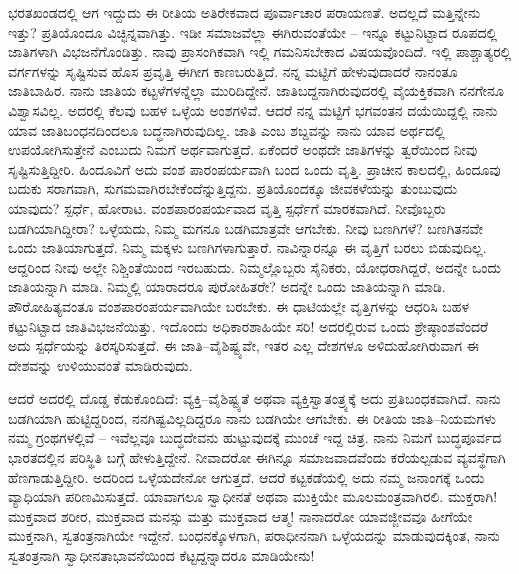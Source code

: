 ಭರತಖಂಡದಲ್ಲಿ ಆಗ ಇದ್ದುದು ಈ ರೀತಿಯ ಅತಿರೇಕವಾದ ಪೂರ್ವಾಚಾರ ಪರಾಯಣತೆ. ಅದಲ್ಲದೆ ಮತ್ತಿನ್ನೇನು ಇತ್ತು? ಪ್ರತಿಯೊಂದೂ ವಿಚ್ಛಿನ್ನವಾಗಿತ್ತು. ಇಡೀ ಸಮಾಜವೆಲ್ಲಾ ಈಗಿರುವಂತೆಯೇ – ಇನ್ನೂ ಕಟ್ಟುನಿಟ್ಟಾದ ರೂಪದಲ್ಲಿ ಜಾತಿಗಳಾಗಿ ವಿಭಜನೆಗೊಂಡಿತ್ತು. ನಾವು ಪ್ರಾಸಂಗಿಕವಾಗಿ ಇಲ್ಲಿ ಗಮನಿಸಬೇಕಾದ ವಿಷಯವೊಂದಿದೆ. ಇಲ್ಲಿ ಪಾಶ್ಚಾತ್ಯರಲ್ಲಿ ವರ್ಗಗಳನ್ನು ಸೃಷ್ಟಿಸುವ ಹೊಸ ಪ್ರವೃತ್ತಿ ಈಗೀಗ ಕಾಣಬರುತ್ತಿದೆ. ನನ್ನ ಮಟ್ಟಿಗೆ ಹೇಳುವುದಾದರೆ ನಾನಂತೂ ಜಾತಿಬಾಹಿರ. ನಾನು ಜಾತಿಯ ಕಟ್ಟಳೆಗಳನ್ನೆಲ್ಲಾ ಮುರಿದಿದ್ದೇನೆ. ಜಾತಿಬದ್ದನಾಗಿರುವುದರಲ್ಲಿ ವೈಯಕ್ತಿಕವಾಗಿ ನನಗೇನೂ ವಿಶ್ವಾಸವಿಲ್ಲ. ಅದರಲ್ಲಿ ಕೆಲವು ಬಹಳ ಒಳ್ಳೆಯ ಅಂಶಗಳಿವೆ. ಆದರೆ ನನ್ನ ಮಟ್ಟಿಗೆ ಭಗವಂತನ ದಯೆಯಿದ್ದಲ್ಲಿ ನಾನು ಯಾವ ಜಾತಿಬಂಧನದಿಂದಲೂ ಬದ್ಧನಾಗಿರುವುದಿಲ್ಲ. ಜಾತಿ ಎಂಬ ಶಬ್ದವನ್ನು ನಾನು ಯಾವ ಅರ್ಥದಲ್ಲಿ ಉಪಯೋಗಿಸುತ್ತೇನೆ ಎಂಬುದು ನಿಮಗೆ ಅರ್ಥವಾಗುತ್ತದೆ. ಏಕೆಂದರೆ ಅಂಥದೇ ಜಾತಿಗಳನ್ನು ತ್ವರೆಯಿಂದ ನೀವು ಸೃಷ್ಟಿಸುತ್ತಿದ್ದೀರಿ. ಹಿಂದೂವಿಗೆ ಅದು ವಂಶ ಪಾರಂಪರ್ಯವಾಗಿ ಬಂದ ಒಂದು ವೃತ್ತಿ. ಪ್ರಾಚೀನ ಕಾಲದಲ್ಲಿ, ಹಿಂದೂವು ಬದುಕು ಸರಾಗವಾಗಿ, ಸುಗಮವಾಗಿರಬೇಕೆಂದೆನ್ನುತ್ತಿದ್ದನು. ಪ್ರತಿಯೊಂದಕ್ಕೂ ಜೀವಕಳೆಯನ್ನು ತುಂಬುವುದು ಯಾವುದು? ಸ್ಪರ್ಧೆ, ಹೋರಾಟ. ವಂಶಪಾರಂಪರ್ಯವಾದ ವೃತ್ತಿ ಸ್ಪರ್ಧೆಗೆ ಮಾರಕವಾಗಿದೆ. ನೀವೊಬ್ಬರು ಬಡಗಿಯಾಗಿದ್ದೀರಾ? ಒಳ್ಳೆಯದು, ನಿಮ್ಮ ಮಗನೂ ಬಡಗಿಮಾತ್ರವೇ ಆಗಬೇಕು. ನೀವು ಬಣಗಿಗಳೆ? ಬಣಗಿತನವೇ ಒಂದು ಜಾತಿಯಾಗುತ್ತದೆ. ನಿಮ್ಮ ಮಕ್ಕಳು ಬಣಗಿಗಳಾಗುತ್ತಾರೆ. ನಾವಿನ್ನಾರನ್ನೂ ಈ ವೃತ್ತಿಗೆ ಬರಲು ಬಿಡುವುದಿಲ್ಲ. ಆದ್ದರಿಂದ ನೀವು ಅಲ್ಲೇ ನಿಶ್ಚಿಂತೆಯಿಂದ ಇರಬಹುದು. ನಿಮ್ಮಲ್ಲೊಬ್ಬರು ಸೈನಿಕರು, ಯೋಧರಾಗಿದ್ದರೆ, ಅದನ್ನೇ ಒಂದು ಜಾತಿಯನ್ನಾಗಿ ಮಾಡಿ. ನಿಮ್ಮಲ್ಲಿ ಯಾರಾದರೂ ಪುರೋಹಿತರೇ? ಅದನ್ನೇ ಒಂದು ಜಾತಿಯನ್ನಾಗಿ ಮಾಡಿ. ಪೌರೋಹಿತ್ಯವಂತೂ ವಂಶಪಾರಂಪರ್ಯವಾಗಿಯೇ ಬರಬೇಕು. ಈ ಧಾಟಿಯಲ್ಲೇ ವೃತ್ತಿಗಳನ್ನು ಆಧರಿಸಿ ಬಹಳ ಕಟ್ಟುನಿಟ್ಟಾದ ಜಾತಿವಿಭಜನೆಯಿತ್ತು. ಇದೊಂದು ಅಧಿಕಾರಶಾಹಿಯೇ ಸರಿ! ಅದರಲ್ಲಿರುವ ಒಂದು ಶ್ರೇಷ್ಠಾಂಶವೆಂದರೆ ಅದು ಸ್ಪರ್ಧೆಯನ್ನು ತಿರಸ್ಕರಿಸುತ್ತದೆ. ಈ ಜಾತಿ–ವೈಶಿಷ್ಟ್ಯವೇ, ಇತರ ಎಲ್ಲ ದೇಶಗಳೂ ಅಳಿದುಹೋಗಿರುವಾಗ ಈ ದೇಶವನ್ನು ಉಳಿಯುವಂತೆ ಮಾಡಿರುವುದು.

ಆದರೆ ಅದರಲ್ಲಿ ದೊಡ್ಡ ಕೆಡುಕೊಂದಿದೆ: ವ್ಯಕ್ತಿ–ವೈಶಿಷ್ಟ್ಯತೆ ಅಥವಾ ವ್ಯಕ್ತಿಸ್ವಾತಂತ್ರ್ಯಕ್ಕೆ ಅದು ಪ್ರತಿಬಂಧಕವಾಗಿದೆ. ನಾನು ಬಡಗಿಯಾಗಿ ಹುಟ್ಟಿದ್ದರಿಂದ, ನನಗಿಷ್ಟವಿಲ್ಲದಿದ್ದರೂ ನಾನು ಬಡಗಿಯೇ ಆಗಬೇಕು. ಈ ರೀತಿಯ ಜಾತಿ–ನಿಯಮಗಳು ನಮ್ಮ ಗ್ರಂಥಗಳಲ್ಲಿವೆ – ಇವೆಲ್ಲವೂ ಬುದ್ಧದೇವನು ಹುಟ್ಟುವುದಕ್ಕೆ ಮುಂಚೆ ಇದ್ದ ಚಿತ್ರ. ನಾನು ನಿಮಗೆ ಬುದ್ಧಪೂರ್ವದ ಭಾರತದಲ್ಲಿನ ಪರಿಸ್ಥಿತಿ ಬಗ್ಗೆ ಹೇಳುತ್ತಿದ್ದೇನೆ. ನೀವಾದರೋ ಈಗಿನ್ನೂ ಸಮಾಜವಾದವೆಂದು ಕರೆಯಲ್ಪಡುವ ವ್ಯವಸ್ಥೆಗಾಗಿ ಹೆಣಗಾಡುತ್ತಿದ್ದೀರಿ. ಅದರಿಂದ ಒಳ್ಳೆಯದೇನೋ ಆಗುತ್ತದೆ. ಆದರೆ ಕಟ್ಟಕಡೆಯಲ್ಲಿ ಅದು ನಮ್ಮ ಜನಾಂಗಕ್ಕೆ ಒಂದು ವ್ಯಾಧಿಯಾಗಿ ಪರಿಣಮಿಸುತ್ತದೆ. ಯಾವಾಗಲೂ ಸ್ವಾಧೀನತೆ ಅಥವಾ ಮುಕ್ತಿಯೇ ಮೂಲಮಂತ್ರವಾಗಿರಲಿ. ಮುಕ್ತರಾಗಿ! ಮುಕ್ತವಾದ ಶರೀರ, ಮುಕ್ತವಾದ ಮನಸ್ಸು ಮತ್ತು ಮುಕ್ತವಾದ ಆತ್ಮ! ನಾನಾದರೋ ಯಾವಜ್ಜೀವವೂ ಹೀಗೆಯೇ ಮುಕ್ತನಾಗಿ, ಸ್ವತಂತ್ರನಾಗಿಯೇ ಇದ್ದೇನೆ. ಬಂಧನಕ್ಕೊಳಗಾಗಿ, ಪರಾಧೀನನಾಗಿ ಒಳ್ಳೆಯದನ್ನು ಮಾಡುವುದಕ್ಕಿಂತ, ನಾನು ಸ್ವತಂತ್ರನಾಗಿ ಸ್ವಾಧೀನತಾಭಾವನೆಯಿಂದ ಕೆಟ್ಟದ್ದನ್ನಾದರೂ ಮಾಡಿಯೇನು!

